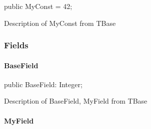 \documentclass{report}
\begin{document}
\begin{list}{}{
\setlength{\itemindent}{0cm}
\setlength{\listparindent}{0cm}
\setlength{\leftmargin}{\evensidemargin}
\addtolength{\leftmargin}{\tmplength}
\settowidth{\labelsep}{X}
\addtolength{\leftmargin}{\labelsep}
\setlength{\labelwidth}{\tmplength}
}
\begin{flushleft}
\item[\textbf{Declaration}\hfill]
\begin{ttfamily}
public MyConst = 42;\end{ttfamily}


\end{flushleft}
\par
\item[\textbf{Description}]
Description of MyConst from TBase

\end{list}
\subsubsection*{\large{\textbf{Fields}}\normalsize\hspace{1ex}\hfill}
\paragraph*{BaseField}\hspace*{\fill}

\begin{list}{}{
\setlength{\itemindent}{0cm}
\setlength{\listparindent}{0cm}
\setlength{\leftmargin}{\evensidemargin}
\addtolength{\leftmargin}{\tmplength}
\settowidth{\labelsep}{X}
\addtolength{\leftmargin}{\labelsep}
\setlength{\labelwidth}{\tmplength}
}
\begin{flushleft}
\item[\textbf{Declaration}\hfill]
\begin{ttfamily}
public BaseField: Integer;\end{ttfamily}


\end{flushleft}
\par
\item[\textbf{Description}]
Description of BaseField, MyField from TBase

\end{list}
\paragraph*{MyField}\hspace*{\fill}
\end{document}
